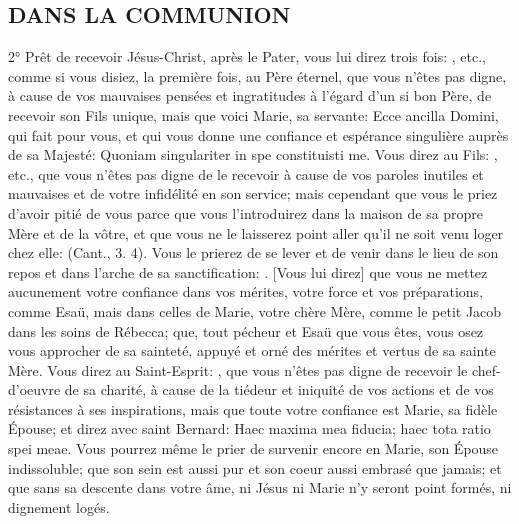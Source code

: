 \subsection{DANS LA COMMUNION}
 2° Prêt de recevoir Jésus-Christ, après le Pater, vous lui direz trois fois: , etc.,
comme si vous disiez, la première fois, au Père éternel, que vous n'êtes pas digne, à cause de vos mauvaises
pensées et ingratitudes à l'égard d'un si bon Père, de recevoir son Fils unique, mais que voici Marie, sa servante:
Ecce ancilla Domini, qui fait pour vous, et qui vous donne une confiance et espérance singulière auprès de sa
Majesté: Quoniam singulariter in spe constituisti me.
 Vous direz au Fils: , etc., que vous n'êtes pas digne de le recevoir à cause de vos
paroles inutiles et mauvaises et de votre infidélité en son service; mais cependant que vous le priez d'avoir pitié de
vous parce que vous l'introduirez dans la maison de sa propre Mère et de la vôtre, et que vous ne le laisserez
point aller qu'il ne soit venu loger chez elle:  (Cant., 3. 4). Vous le prierez de se lever et de venir dans le lieu de son
repos et dans l'arche de sa sanctification: . [Vous
lui direz] que vous ne mettez aucunement votre confiance dans vos mérites, votre force et vos préparations,
comme Esaü, mais dans celles de Marie, votre chère Mère, comme le petit Jacob dans les soins de Rébecca; que,
tout pécheur et Esaü que vous êtes, vous osez vous approcher de sa sainteté, appuyé et orné des mérites et
vertus de sa sainte Mère.
 Vous direz au Saint-Esprit: , que vous n'êtes pas digne de recevoir le chef-d'oeuvre
de sa charité, à cause de la tiédeur et iniquité de vos actions et de vos résistances à ses inspirations, mais que
toute votre confiance est Marie, sa fidèle Épouse; et direz avec saint Bernard: Haec maxima mea fiducia; haec tota
ratio spei meae. Vous pourrez même le prier de survenir encore en Marie, son Épouse indissoluble; que son sein
est aussi pur et son coeur aussi embrasé que jamais; et que sans sa descente dans votre âme, ni Jésus ni Marie
n'y seront point formés, ni dignement logés.

